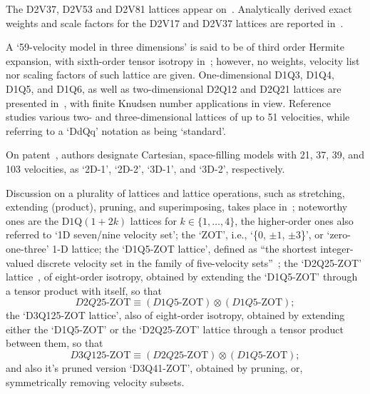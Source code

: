     The D2V37, D2V53 and D2V81 lattices appear on~\cite{2007-PhilippiPC+DosSantosLOE-IntJModPhysC}. Analytically  derived  exact
    weights and scale factors for the D2V17 and D2V37 lattices are reported in~\cite{2007-SiebertDN+PhilippiPC-IntJModPhysC}.

    A `59-velocity model in three dimensions' is said to be of third order Hermite expansion, with sixth-order  tensor  isotropy
    in~\cite{2008-ChenH+ShanX-PhysD}; however, no weights, velocity  list  nor  scaling  factors  of  such  lattice  are  given.
    One-dimensional  D1Q3,  D1Q4,  D1Q5,  and  D1Q6,  as  well  as  two-dimensional  D2Q12  and  D2Q21  lattices  are  presented
    in~\cite{2008-KimSH+BoydID-JComputPhys},      with      finite      Knudsen      number      applications      in      view.
    Reference~\cite{2008-RubinsteinR+LuoLS-PhysRev} studies various two- and three-dimensional lattices of up to 51  velocities,
    while referring to a `DdQq' notation as being `standard'.

    On patent~\cite{2008-ShanX+ZhangR-USPat}, authors designate Cartesian,  space-filling  models  with  21,  37,  39,  and  103
    velocities, as `2D-1', `2D-2', `3D-1', and `3D-2', respectively.

    Discussion on a plurality of lattices and lattice  operations,  such  as  stretching,  extending  (product),  pruning,  and
    superimposing, takes place in~\cite{2009-ChikatamarlaSS+KarlinIV-PhysRevE}; noteworthy ones are the  D$1$Q$(1+2k)$  lattices
    for $k \in \{1, \ldots, 4\}$, the higher-order ones also referred to `1D seven/nine velocity set'; the `ZOT', i.e.,  `\{$0$,
    $\pm 1$, $\pm 3$\}', or  `zero-one-three'  1-D  lattice;  the  `D1Q5-ZOT  lattice',  defined  as  ``{\swshape  the  shortest
    integer-valued        discrete        velocity        set        in        the        family        of         five-velocity
    sets\/}''~\cite{2006-ChikatamarlaSS+KarlinIV-PhysRevLett};                          the                          `D2Q25-ZOT'
    lattice~\cite{2008-ChikatamarlaSS+KarlinIV-CompPhysComm}, of eight-order isotropy,  obtained  by  extending  the  `D1Q5-ZOT'
    through a tensor product with itself, so that%
    \begin{equation}
        D2Q25\mbox{-ZOT} \equiv (D1Q5\mbox{-ZOT}) \otimes (D1Q5\mbox{-ZOT});
    \end{equation}
    \noindent the `D3Q125-ZOT lattice', also of eight-order iso\-tro\-py, obtained by extending either  the  `D1Q5-ZOT'  or  the
    `D2Q25-ZOT' lattice through a tensor product between them, so that%
    \begin{equation}
        D3Q125\mbox{-ZOT} \equiv (D2Q25\mbox{-ZOT}) \otimes (D1Q5\mbox{-ZOT});
    \end{equation}
    \noindent and also it's pruned version `D3Q41-ZOT', obtained by pruning, or, symmetrically removing velocity subsets.

